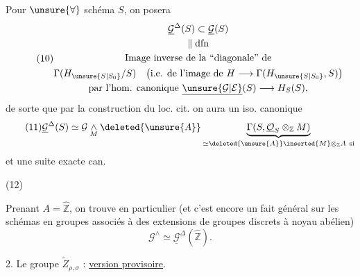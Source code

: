 Pour $\unsure{\forall}$ schéma $S$, on posera
\[
\tag{10}
\begin{gathered}
\underline{\mathcal G}^{\Delta}(S)\subset\underline{\mathcal G}(S)\\
\Vert\;\mathrm{dfn}\\
\text{Image inverse de la ``diagonale'' de}\\
\Gamma(H_{\unsure{S|S_0}}/S)
\quad\bigl(\text{i.e. de l'image de }H\longrightarrow\Gamma(H_{\unsure{S|S_0}},S)\bigr)\\
\text{par l'hom. canonique }\underline{\unsure{\mathcal G|\mathcal E}}(S)\longrightarrow H_S(S),
\end{gathered}
\]
de sorte que par la construction du loc. cit. on aura un iso. canonique
\[
\tag{11}
\underline{\mathcal G}^{\Delta}(S)\simeq
\mathcal G\underset{M}{\wedge}\deleted{\unsure{A}}
\underbrace{\Gamma(S,\underline{\mathcal O}_S\otimes_{\mathbb Z}M)}_{
\simeq\deleted{\unsure{A}}\inserted{M}\otimes_{\mathbb Z}A\ \text{si}}
\]
et une suite exacte can.

(12)\quad{}


Prenant $A=\widehat{\mathbb Z}$, on trouve en particulier (et c'est encore un fait général sur les schémas en groupes associés à des extensions de groupes discrets à noyau abélien)
\[
\tag{13}
\mathcal G^{\wedge}\simeq\underline{\mathcal G}^{\Delta}(\widehat{\mathbb Z}).
\]


2. Le groupe $\widetilde Z_{\rho,\sigma}$ : \uline{version provisoire}.

